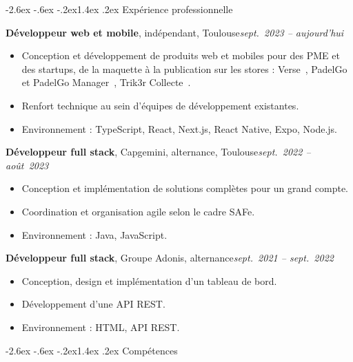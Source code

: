 \documentclass[10pt,a4paper]{article}
\makeatletter
\renewcommand\section{\@startsection{section}{1}{\z@}%
  {-2.6ex \@plus -.6ex \@minus -.2ex}{1.4ex \@plus .2ex}%
  {\normalfont\Large\bfseries}}
\newcommand{\entry}[2]{\par\noindent #1\hfill\textit{#2}\par}
\makeatother
\begin{document}
\section{Expérience professionnelle}

\entry{\textbf{Développeur web et mobile}, indépendant, Toulouse}
      {sept.~2023 -- aujourd’hui}
\begin{itemize}
  \item Conception et développement de produits web et mobiles pour des PME et
        des startups, de la maquette à la publication sur les stores :
        Verse~\cite{verse}, PadelGo et PadelGo Manager~\cite{padelgo},
        Trik3r Collecte~\cite{trik3r}.
  \item Renfort technique au sein d’équipes de développement existantes.
  \item Environnement : TypeScript, React, Next.js, React Native, Expo, Node.js.
\end{itemize}

\smallskip
\entry{\textbf{Développeur full stack}, Capgemini, alternance, Toulouse}
      {sept.~2022 -- août~2023}
\begin{itemize}
  \item Conception et implémentation de solutions complètes pour un grand compte.
  \item Coordination et organisation agile selon le cadre SAFe.
  \item Environnement : Java, JavaScript.
\end{itemize}

\smallskip
\entry{\textbf{Développeur full stack}, Groupe Adonis, alternance}
      {sept.~2021 -- sept.~2022}
\begin{itemize}
  \item Conception, design et implémentation d’un tableau de bord.
  \item Développement d’une API REST.
  \item Environnement : HTML, API REST.
\end{itemize}

\section{Compétences}
\end{document}
